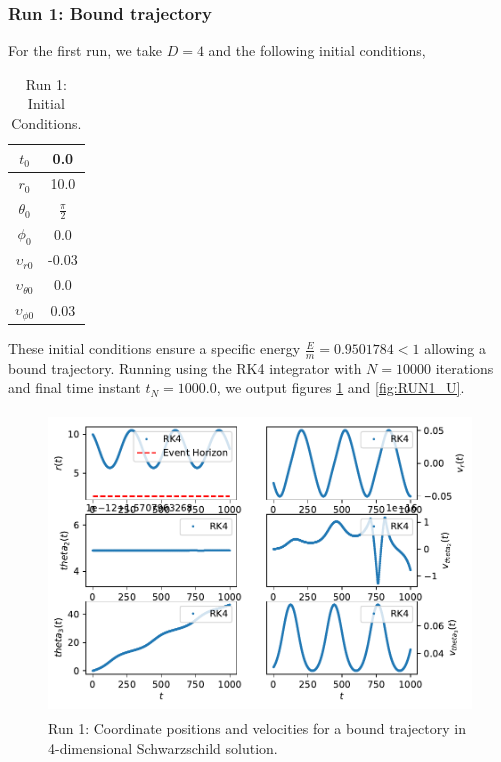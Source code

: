 \subsubsection{Run 1: Bound trajectory}
For the first run, we take $D=4$ and the following initial conditions,
\begin{table}[H]
	\centering
	\begin{tabular}{|c|c|}
		\hline
		$t_0$ & 0.0 \\
		\hline
		$r_0$ & 10.0 \\
		\hline
		$\theta_0$ & $\frac{\pi}{2}$ \\
		\hline
		$\phi_0$ & 0.0 \\
		\hline
		\hline
		$\upsilon_{r0}$ & -0.03 \\
		\hline
		$\upsilon_{\theta0}$ & 0.0 \\
		\hline
		$\upsilon_{\phi0}$ & 0.03 \\
		\hline
	\end{tabular}
	\caption[Run 1: Initial Conditions]{Run 1: Initial Conditions.}
	\label{tbl:RUN1_IC}
\end{table}

These initial conditions ensure a specific energy $\frac{E}{m} = 0.9501784 < 1$ allowing a bound trajectory. Running using the RK4 integrator with $N=10000$ iterations and final time instant $t_{N} = 1000.0$, we output figures \ref{fig:RUN1_xv} and \ref{fig:RUN1_U}.

\begin{figure}
	\centering
	\includegraphics[height=8cm]{Figures/xv_t_Rotating.pdf}
	\caption[Run 1: Coordinate positions and velocities]{Run 1: Coordinate positions and velocities for a bound trajectory in 4-dimensional Schwarzschild solution.}
	\label{fig:RUN1_xv}
\end{figure}

